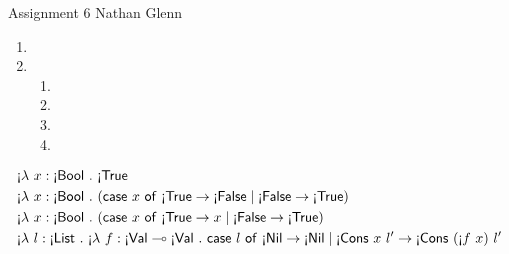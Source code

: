 \documentclass[11pt]{article}
\newcommand{\lfun}[3]{\text{\textexclamdown}\lambda~{#1}:{#2}~.~{#3}}
\newcommand{\lapp}[2]{\text{\textexclamdown}{#1}~{#2}}
\newcommand{\lcase}[2]{\mathsf{case}~{#1}~\mathsf{of}~{#2}}
\newcommand{\ltyprim}[1]{\text{\textexclamdown}\msf{#1}}
\newcommand{\ltyfun}[2]{{#1} \multimap {#2}}
\begin{document}
\hwtitle
  {Assignment 6}
  {Nathan Glenn}


\begin{enumerate}
\item %

\item
  \begin{enumerate} %
    \item
    \item
    \item
    \item
  \end{enumerate}
\end{enumerate}

\begin{align*}
&\lfun{x}{\ltyprim{Bool}}{\ltyprim{True}} \\
&\lfun {x}{\ltyprim{Bool}}{(\lcase{x}{
  \ltyprim{True} \rightarrow \ltyprim{False} \mid \ltyprim{False} \rightarrow \ltyprim{True}})} \\
&\lfun {x}{\ltyprim{Bool}}{(\lcase{x}{
  \ltyprim{True} \rightarrow x \mid \ltyprim{False} \rightarrow \ltyprim{True}})} \\
&\lfun{l}{\ltyprim{List}}{
  \lfun{f}{\ltyfun{\ltyprim{Val}}{\ltyprim{Val}}}
  {\lcase{l}{\ltyprim{Nil} \rightarrow \ltyprim{Nil} \mid \ltyprim{Cons}~x~l' \rightarrow \ltyprim{Cons}~(\lapp{f}{x})~l'}}}
\end{align*}
\end{document}
